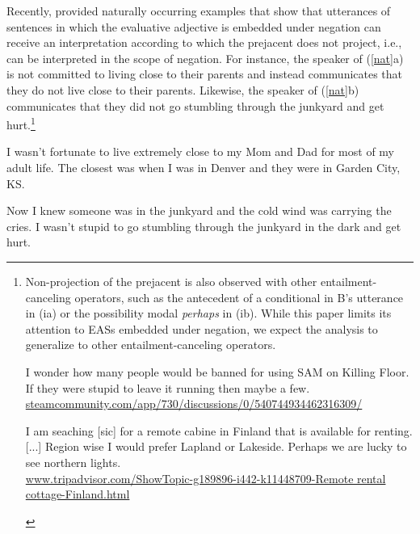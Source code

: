 \documentclass[11pt,fleqn]{article}
\newcommand{\6}{\mbox{$[\hspace*{-.6mm}[$}}
\newcommand{\9}{\mbox{$]\hspace*{-.6mm}]$}}
\begin{document}
Recently, \citet{karttunen-etal2014} provided naturally occurring examples that show that utterances of sentences in which the evaluative adjective is embedded under negation can receive an interpretation according to which the prejacent does not project, i.e., can be interpreted in the scope of negation. For instance, the speaker of (\ref{nat}a) is not committed to living close to their parents and instead communicates that they do not live close to their parents. Likewise, the speaker of (\ref{nat}b) communicates that they did not go stumbling through the junkyard and get hurt.\footnote{Non-projection of the prejacent is also observed with  other entailment-canceling operators, such as the antecedent of a conditional in B's utterance in (ia) or the possibility modal {\em perhaps} in (ib). While this paper limits its attention to EASs embedded under negation, we expect the analysis to generalize  to other entailment-canceling operators.

\begin{exe}
\begin{xlist}
\ex 
\begin{xlist}
 I wonder how many people would be banned for using SAM on Killing Floor.
 If they were stupid to leave it running then maybe a few.\\ \url{steamcommunity.com/app/730/discussions/0/540744934462316309/}
\end{xlist}

\ex I am seaching [sic] for a remote cabine in Finland that is available for renting. [...]
Region wise I would prefer Lapland or Lakeside. Perhaps we are lucky to see northern lights. \\ \url{www.tripadvisor.com/ShowTopic-g189896-i442-k11448709-Remote rental cottage-Finland.html}

\end{xlist}
\end{exe}

}

\begin{exe}
\ex\label{nat} \citealt[235]{karttunen-etal2014}
\begin{xlist}
\ex I wasn't fortunate to live extremely close to my Mom and Dad for most of my adult life. The closest was when I was in Denver and they were in Garden City, KS.

\ex  Now I knew someone was in the junkyard and the cold wind was
carrying the cries. I wasn't stupid to go stumbling through the
junkyard in the dark and get hurt.

\end{xlist} \end{exe} 
\end{document}
